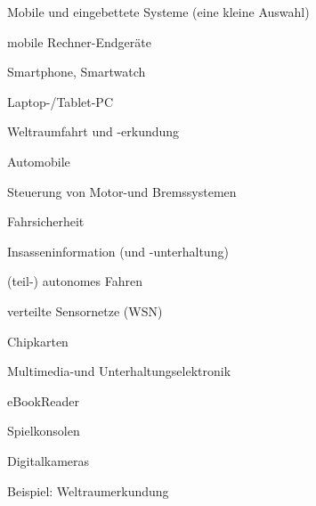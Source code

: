 \documentclass[a4paper]{article}
\begin{document}
\begin{multicols}{3}
    Mobile und eingebettete Systeme (eine kleine Auswahl)

    \begin{itemize*}
        \item
        mobile Rechner-Endgeräte
        \begin{itemize*}
            \item Smartphone, Smartwatch
            \item Laptop-/Tablet-PC
        \end{itemize*}
        \item
        Weltraumfahrt und -erkundung
        \item
        Automobile
        \begin{itemize*}
            \item Steuerung von Motor-und Bremssystemen
            \item Fahrsicherheit
            \item Insasseninformation (und -unterhaltung)
            \item (teil-) autonomes Fahren
        \end{itemize*}
        \item
        verteilte Sensornetze (WSN)
        \item
        Chipkarten
        \item
        Multimedia-und Unterhaltungselektronik
        \begin{itemize*}
            \item eBookReader
            \item Spielkonsolen
            \item Digitalkameras
        \end{itemize*}
    \end{itemize*}

    Beispiel: Weltraumerkundung


\end{multicols}
\end{document}
